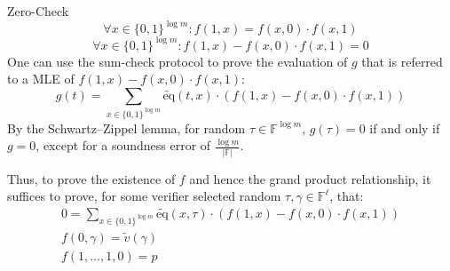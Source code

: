 \documentclass{zkdl-presentation-template}
\begin{document}
    \begin{frame}{Zero-Check}
        \begin{equation*}
            \forall x \in \{0,1\}^{\log m}\colon f(1,x) = f(x, 0) \cdot f(x, 1)
        \end{equation*}
        \pause
        \vspace{-10px}
        \begin{equation*}
            \forall x \in \{0,1\}^{\log m}\colon f(1,x) - f(x, 0) \cdot f(x, 1) = 0
        \end{equation*}
        \pause
        One can use the sum-check protocol to prove the evaluation of $g$ that is referred to a MLE of $f(1,x) - f(x, 0) \cdot f(x, 1)$:
        \begin{equation*}
            g(t) = \sum_{x \in \{0,1\}^{\log m}} \widetilde{\text{eq}}(t,x) \cdot (f(1,x) - f(x, 0) \cdot f(x, 1))
        \end{equation*}
        \pause
        By the Schwartz–Zippel lemma, for random $\tau \in \mathbb{F}^{\log m}$,
        $g(\tau) = 0$ if and only if $g = 0$, except for a soundness error of $\frac{\log m}{|\mathbb{F}|}$.
    \end{frame}

    \begin{frame}
        Thus, to prove the existence of $f$ and hence the grand product relationship, it suffices
        to prove, for some verifier selected random $\tau, \gamma \in \mathbb{F}^\ell$, that:
        \begin{gather}
        \label{eq:grands0}
            0 = \sum_{x \in \{0,1\}^{\log m}} \widetilde{\text{eq}}(x, \tau) \cdot (f(1,x) - f(x, 0) \cdot f(x, 1))\\
        \label{eq:grands1}
            f(0, \gamma) = \widetilde{v}(\gamma)\\
        \label{eq:grands2}
            f(1,\dots,1, 0) = p
        \end{gather}
    \end{frame}
\end{document}
